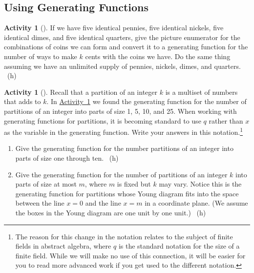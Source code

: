 \documentclass[10pt,]{book}
\theoremstyle{plain}
\theoremstyle{definition}
\theoremstyle{definition}
\theoremstyle{definition}
\newtheorem{activity}[project]{Activity}
\numberwithin{equation}{chapter}
\begin{document}
\subsection[{Using Generating Functions}]{Using Generating Functions}\label{sec_genfns-int-parts}
\begin{activity}[]\label{change-making}
\hypertarget{p-1562}{}%
If we have five identical pennies, five identical nickels, five identical dimes, and five identical quarters, give the picture enumerator for the combinations of coins we can form and convert it to a generating function for the number of ways to make \(k\) cents with the coins we have. Do the same thing assuming we have an unlimited supply of pennies, nickels, dimes, and quarters.%
~{\tiny (h)}\end{activity}
\begin{activity}[]\label{activity-310}
\hypertarget{p-1567}{}%
Recall that a partition of an integer \(k\) is a multiset of numbers that adds to \(k\). In \hyperref[change-making]{Activity~\ref{change-making}} we found the generating function for the number of partitions of an integer into parts of size 1, 5, 10, and 25. When working with generating functions for partitions, it is becoming standard to use \(q\) rather than \(x\) as the variable in the generating function.  Write your answers in this notation.\footnote{The reason for this change in the notation relates to the subject of finite fields in abstract algebra, where \(q\) is the standard notation for the size of a finite field.  While we will make no use of this connection, it will be easier for you to read more advanced work if you get used to the different notation.\label{fn-20}}%
\begin{enumerate}[font=\bfseries,label=(\alph*),ref=\alph*]
\item\label{task-269} \hypertarget{p-1568}{}%
Give the generating function for the number partitions of an integer into parts of size one through ten.%
~{\tiny (h)}\item\label{largestpartatmostm} \hypertarget{p-1571}{}%
Give the generating function for the number of partitions of an integer \(k\) into parts of size at most \(m\), where \(m\) is fixed but \(k\) may vary. Notice this is the generating function for partitions whose Young diagram fits into the space between the line \(x=0\) and the line \(x=m\) in a coordinate plane. (We assume the boxes in the Young diagram are one unit by one unit.)%
~{\tiny (h)}\end{enumerate}
\end{activity}
\end{document}
